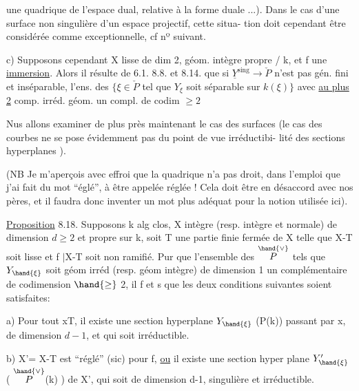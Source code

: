 une quadrique de l'espace dual, relative à la forme duale ...).   Dans le
cas d'une surface non singulière  d'un espace projectif, cette situa-%
tion doit cependant être considérée comme exceptionnelle, cf nº suivant.

c) Supposons cependant X lisse de dim 2, géom. intègre propre / k, et f une \uline{immersion}. Alors il résulte de 6.1.  8.8. et 8.14. que si $\underline{Y}^{\mathrm{sing}} \to \check{P}$ n'est pas gén. fini et inséparable, l'ens. des $\{\xi \in \check{P}$ tel que $Y_{\xi}$ soit  séparable sur $k(\xi)\}$ avec \uline{au plus 2} comp. irréd. géom.  un compl. de codim $\geq 2$

Nus allons examiner de plus près   maintenant le cas des surfaces
(le cas des courbes ne se pose évidemment pas du point de vue irréductibi-%
lité des sections hyperplanes  ).

(NB  Je m'aperçois avec effroi que la quadrique n'a pas droit, dans
l'emploi que j'ai fait du mot ``églé'', à être appelée réglée !  Cela doit
être en désaccord avec nos pères, et il faudra donc inventer un mot plus
adéquat pour la notion utilisée ici).

\uline{Proposition} 8.18.  Supposons  k alg clos, X 
 intègre (resp. intègre et normale) de dimension $d \geq 2$ et
propre sur k, soit T une partie finie fermée de X telle que  X-T soit
lisse  et f $|$X-T  soit non ramifié.  Pur que l'ensemble des \hand{$\xi \in$} $\overset{\hand{\vee}}{P}$  tels
que  $Y_{\hand{\xi}}$  soit  géom irréd   (resp.  géom intègre)  de dimension  1
  un complémentaire de  codimension $\hand{\geq}$ 2, il f et s que les deux
conditions suivantes soient satisfaites:

a)  Pour tout x\hand{$\in$}T, il existe une section hyperplane $Y_{\hand{\xi}}$   (\hand{$\xi \in$}P(k))
passant par x, de dimension $d-1$, et qui soit irréductible.

b) X'= X-T est ``réglé'' (sic)  pour f, \uline{ou}  il existe  une section hyper
plane  $Y'_{\hand{\xi}}$  (\hand{$\xi \in$} $\overset{\hand{\vee}}{P}$(k) )  de X',   qui soit de dimension d-1,
singulière et  irréductible.




